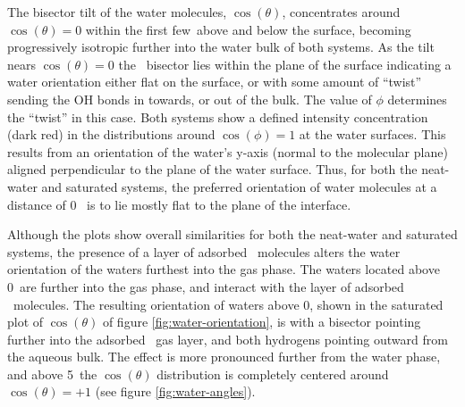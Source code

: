 The bisector tilt of the water molecules, $\cos(\theta)$, concentrates around $\cos(\theta)=0$ within the first few\angs~above and below the surface, becoming progressively isotropic further into the water bulk of both systems. As the tilt nears $\cos(\theta)=0$ the \wat~bisector lies within the plane of the surface indicating a water orientation either flat on the surface, or with some amount of ``twist'' sending the OH bonds in towards, or out of the bulk. The value of $\phi$ determines the ``twist'' in this case. Both systems show a defined intensity concentration (dark red) in the distributions around $\cos(\phi)=1$ at the water surfaces. This results from an orientation of the water's y-axis (normal to the molecular plane) aligned perpendicular to the plane of the water surface. Thus, for both the neat-water and saturated systems, the preferred orientation of water molecules at a distance of 0\angs~ is to lie mostly flat to the plane of the interface.

Although the plots show overall similarities for both the neat-water and saturated systems, the presence of a layer of adsorbed \suldiox~molecules alters the water orientation of the waters furthest into the gas phase. The waters located above 0\angs~are further into the gas phase, and interact with the layer of adsorbed \suldiox~molecules. The resulting orientation of waters above 0\angs, shown in the saturated plot of $\cos(\theta)$ of figure \ref{fig:water-orientation}, is with a bisector pointing further into the adsorbed \suldiox~gas layer, and both hydrogens pointing outward from the aqueous bulk. The effect is more pronounced further from the water phase, and above 5\angs~the $\cos(\theta)$ distribution is completely centered around $\cos(\theta)=+1$ (see figure \ref{fig:water-angles}).


